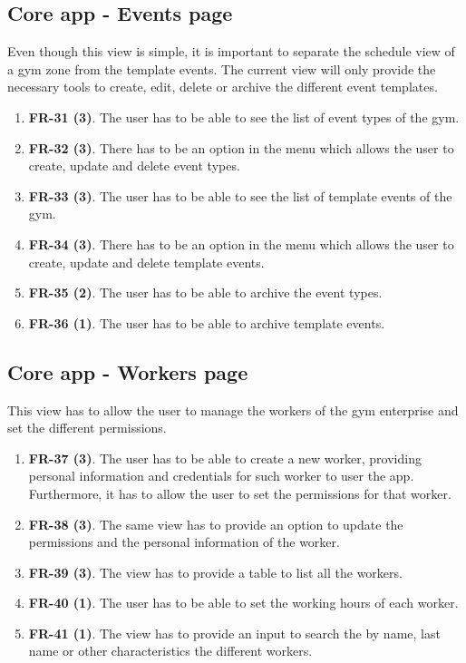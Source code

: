 \documentclass[a4paper, 12pt, oneside]{book}
\begin{document}
\subsection{Core app - Events page}
Even though this view is simple, it is important to separate the schedule view of a gym zone from the template events. The current view will only provide the necessary tools to create, edit, delete or archive the different event templates.
\begin{enumerate}[label = -]
	\item \textbf{FR-31 (3)}. The user has to be able to see the list of event types of the gym.
	\item \textbf{FR-32 (3)}. There has to be an option in the menu which allows the user to create, update and delete event types.
	\item \textbf{FR-33 (3)}. The user has to be able to see the list of template events of the gym.
	\item \textbf{FR-34 (3)}. There has to be an option in the menu which allows the user to create, update and delete template events.
	\item \textbf{FR-35 (2)}. The user has to be able to archive the event types.
	\item \textbf{FR-36 (1)}. The user has to be able to archive template events.
\end{enumerate}
\subsection{Core app - Workers page}
This view has to allow the user to manage the workers of the gym enterprise and set the different permissions.
\begin{enumerate}[label = -]
	\item \textbf{FR-37 (3)}. The user has to be able to create a new worker, providing personal information and credentials for such worker to user the app. Furthermore, it has to allow the user to set the permissions for that worker.
	\item \textbf{FR-38 (3)}. The same view has to provide an option to update the permissions and the personal information of the worker.
	\item \textbf{FR-39 (3)}. The view has to provide a table to list all the workers.
	\item \textbf{FR-40 (1)}. The user has to be able to set the working hours of each worker.
	\item \textbf{FR-41 (1)}. The view has to provide an input to search the by name, last name or other characteristics the different workers.
\end{enumerate}
\end{document}
